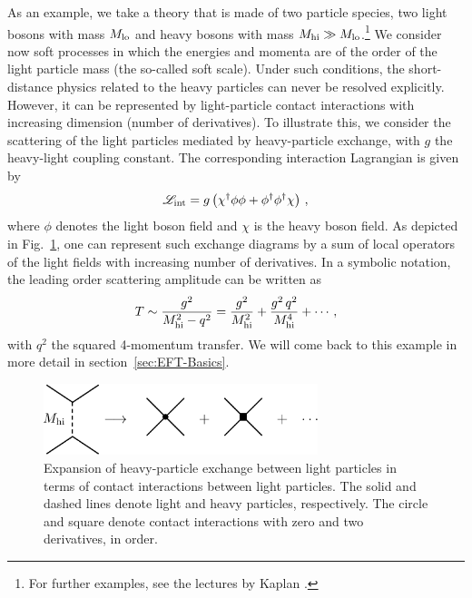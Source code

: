 As an example, we take a theory that is made of two
particle species, two light bosons with mass $M_{\rm lo}$ and heavy
bosons with mass $M_{\rm hi} \gg M_{\rm lo}$.\footnote{For further examples,
see the lectures by Kaplan \cite{Kaplan:1995uv,Kaplan:2005es}.}
We consider now soft processes
in which the energies and momenta are of the order of the 
light particle mass (the so-called soft scale). 
Under such conditions, the short-distance
physics related to the heavy particles can never be resolved explicitly.
However, it can be represented by light-particle contact interactions 
with increasing dimension (number of derivatives). To illustrate this,
we consider the scattering of the light particles mediated by
heavy-particle exchange, with
$g$ the heavy-light coupling constant. The corresponding interaction
Lagrangian is given by
\begin{equation}
 {\mathcal L}_{\rm int}=g\left(\chi^\dagger \phi \phi +
 \phi^\dagger \phi^\dagger \chi\right)\,,
\end{equation}
where $\phi$ denotes the light boson field and
$\chi$ is the heavy boson field. As depicted in
Fig.~\ref{fig:resosat}, one can represent such exchange diagrams by a 
sum of local operators of the light fields with increasing
number of derivatives. In a symbolic notation, the leading order 
scattering amplitude can be written as
\begin{equation}
 T\sim \frac{g^2}{M_{\rm hi}^2 - q^2} = \frac{g^2}{M_{\rm hi}^2} + 
 \frac{g^2 \, q^2}{M_{\rm hi}^4} + \cdots \,,
\end{equation}
with $q^2$ the squared 4-momentum transfer.  We will come back
to this example in more detail in section~\ref{sec:EFT-Basics}.
\begin{figure}[tb]
\centerline{\includegraphics*[width=8cm]{BosonContact-2body-simple}}
\caption{Expansion of heavy-particle exchange
between light particles in terms of contact interactions between
light particles. The solid and dashed lines denote light and heavy
particles, respectively. The circle and square
denote contact interactions with zero and two derivatives, in order.
\label{fig:resosat}}
\end{figure}

